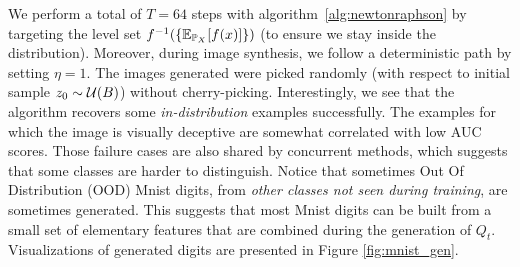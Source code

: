 We perform a total of $T=64$ steps with algorithm~\ref{alg:newtonraphson} by targeting the level set $f^{-1}(\{\mathbb{E}_{\mathbb{P}_X}[f(x)]\})$ (to ensure we stay inside the distribution). Moreover, during image synthesis, we follow a deterministic path by setting $\eta=1$. The images generated were picked randomly (with respect to initial sample $z_0\sim\mathcal{U}(B)$) without cherry-picking. Interestingly, we see that the algorithm recovers some \textit{in-distribution} examples successfully.    
The examples for which the image is visually deceptive are somewhat correlated with low AUC scores. Those failure cases are also shared by concurrent methods, which suggests that some classes are harder to distinguish. Notice that sometimes Out Of Distribution (OOD) Mnist digits, from \textit{other classes not seen during training}, are sometimes generated. This suggests that most Mnist digits can be built from a small set of elementary features that are combined during the generation of $Q_t$. Visualizations of generated digits are presented in Figure \ref{fig:mnist_gen}.

